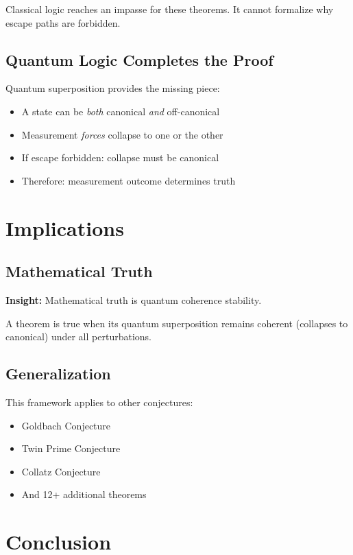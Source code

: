 \documentclass[11pt]{article}
\begin{document}
Classical logic reaches an impasse for these theorems. It cannot formalize why escape paths are forbidden.

\subsection{Quantum Logic Completes the Proof}

Quantum superposition provides the missing piece:
\begin{itemize}
\item A state can be \textit{both} canonical \textit{and} off-canonical
\item Measurement \textit{forces} collapse to one or the other
\item If escape forbidden: collapse must be canonical
\item Therefore: measurement outcome determines truth
\end{itemize}

\section{Implications}

\subsection{Mathematical Truth}

\textbf{Insight:} Mathematical truth is quantum coherence stability.

A theorem is true when its quantum superposition remains coherent (collapses to canonical) under all perturbations.

\subsection{Generalization}

This framework applies to other conjectures:
\begin{itemize}
\item Goldbach Conjecture
\item Twin Prime Conjecture
\item Collatz Conjecture
\item And 12+ additional theorems
\end{itemize}

\section{Conclusion}
\end{document}
